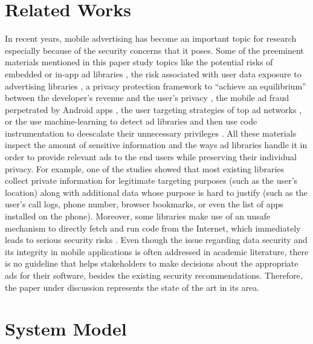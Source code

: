\documentclass[conference]{IEEEtran}
\begin{document}
\section{Related Works}
In recent years, mobile advertising has become an important topic for research especially because of the security concerns that it poses. Some of the preeminent materials mentioned in this paper study topics like the potential risks of embedded or in-app ad libraries \cite{Grace}, the risk associated with user data exposure to advertising libraries \cite{meng2016price}, a privacy protection framework to “achieve an equilibrium” between the developer’s revenue and the user’s privacy \cite{leontiadis2012don}, the mobile ad fraud perpetrated by Android apps \cite{crussell2014madfraud}, the user targeting strategies of top ad networks \cite{nath2015madscope}, or the use machine-learning to detect ad libraries and then use code instrumentation to deescalate their unnecessary privileges \cite{liu2015efficient}.
All these materials inspect the amount of sensitive information and the ways ad libraries handle it in order to provide relevant ads to the end users while preserving their individual privacy. For example, one of the studies showed that most existing libraries collect private information for legitimate targeting purposes (such as the user’s location) along with additional data whose purpose is hard to justify (such as the user’s call logs, phone number, browser bookmarks, or even the list of apps installed on the phone). Moreover, some libraries make use of an unsafe mechanism to directly fetch and run code from the Internet, which immediately leads to serious security risks \cite{Grace}. 
Even though the issue regarding data security and its integrity in mobile applications is often addressed in academic literature, there is no guideline that helps stakeholders to make decisions about the appropriate ads for their software, besides the existing security recommendations. Therefore, the paper under discussion represents the state of the art in its area.

\section{System Model}
\end{document}
